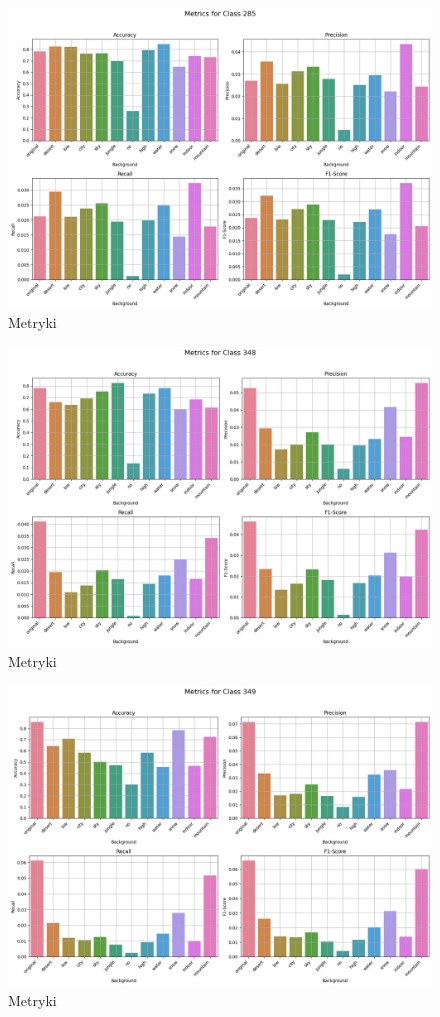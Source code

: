 \begin{figure}
	\centering\includegraphics[width=.9\textwidth]{img/285}
	\caption{Metryki}
	\label{rys:285}
\end{figure}

\begin{figure}
	\centering\includegraphics[width=.9\textwidth]{img/348}
	\caption{Metryki}
	\label{rys:348}
\end{figure}

\begin{figure}
	\centering\includegraphics[width=.9\textwidth]{img/349}
	\caption{Metryki}
	\label{rys:349}
\end{figure}

